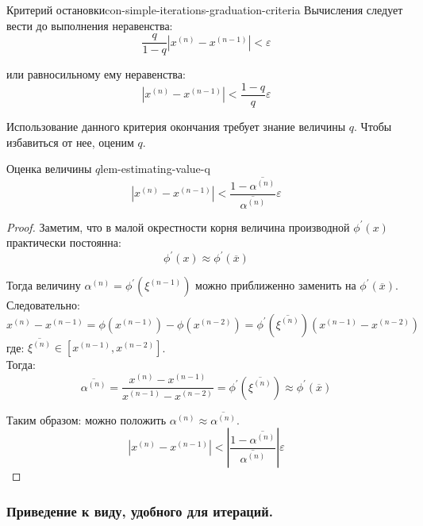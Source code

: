 \documentclass[14pt]{extarticle}
\begin{document}
        \begin{consequence}{Критерий остановки}{con-simple-iterations-graduation-criteria}
            Вычисления следует вести до выполнения неравенства:
            $$\frac{q}{1 - q}|x^{(n)} - x^{(n - 1)}| < \varepsilon$$
            
            или равносильному ему неравенства:
            $$|x^{(n)} - x^{(n - 1)}| < \frac{1-q}{q} \varepsilon$$
        \end{consequence}

        Использование данного критерия окончания требует знание величины $q$. Чтобы избавиться от нее, оценим $q$.

        \begin{lemma}{Оценка величины $q$}{lem-estimating-value-q}
            $$|x^{(n)} - x^{(n - 1)}| < \frac{1 - \overline{\alpha^{(n)}}}{\overline{\alpha^{(n)}}} \varepsilon$$

            \begin{proof}
                Заметим, что в малой окрестности корня величина производной $\phi^{'}(x)$ практически постоянна: 
                $$\phi^{'}(x) \approx \phi^{'}(\overline{x})$$

                Тогда величину $\alpha^{(n)} = \phi^{'}(\xi^{(n - 1)})$ можно приближенно заменить на $\phi^{'}(\overline{x})$.\\
                Следовательно:
                $$x^{(n)} - x^{(n - 1)} = \phi(x^{(n - 1)}) - \phi(x^{(n - 2)}) = \phi^{'}(\overline{\xi^{(n)}})(x^{(n - 1)} - x^{(n - 2)})$$
                где: $\overline{\xi^{(n)}} \in [x^{(n - 1)}, x^{(n - 2)}]$.\\

                Тогда:
                $$\overline{\alpha^{(n)}} = \frac{x^{(n)} - x^{(n - 1)}}{x^{(n - 1)} - x^{(n - 2)}} = \phi^{'}(\overline{\xi^{(n)}}) \approx \phi^{'}(\overline{x})$$
            
                Таким образом: можно положить $\alpha^{(n)} \approx \overline{\alpha^{(n)}}$.
                $$|x^{(n)} - x^{(n - 1)}| < |\frac{1 - \overline{\alpha^{(n)}}}{\overline{\alpha^{(n)}}}| \varepsilon$$
            \end{proof}
        \end{lemma}

    \clearpage
    \subsubsection{Приведение к виду, удобного для итераций.}
        
\end{document}
